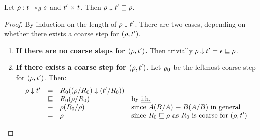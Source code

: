 \begin{lemma}
Let $\rho : t \mathrel{\twoheadrightarrow_\beta} s$ and $t' \mathrel{\ltimes} t$.
Then $\rho \downarrow t' \sqsubseteq \rho$.
\end{lemma}
\begin{proof}
By induction on the length of $\rho \downarrow t'$.
There are two cases, depending on whether there exists a coarse step for $(\rho,t')$.
\begin{enumerate}
\item {\bf If there are no coarse steps for $(\rho,t')$.}
  Then trivially $\rho \downarrow t' = \epsilon \sqsubseteq \rho$.
\item {\bf If there exists a coarse step for $(\rho,t')$.}
  Let $\rho_0$ be the leftmost coarse step for $(\rho,t')$.
  Then:
  \[
    \begin{array}{rcll}
      \rho \downarrow t'
      & = & R_0((\rho/R_0) \downarrow (t'/R_0)) \\
      & \sqsubseteq & R_0(\rho/R_0) & \text{by {\em i.h.}} \\
      & \equiv  & \rho(R_0/\rho)  & \text{since $A(B/A) \equiv B(A/B)$ in general} \\
      & =       & \rho                    & \text{since $R_0 \sqsubseteq \rho$ as $R_0$ is coarse for $(\rho,t')$} \\
    \end{array}
  \]
\end{enumerate}
\end{proof}
